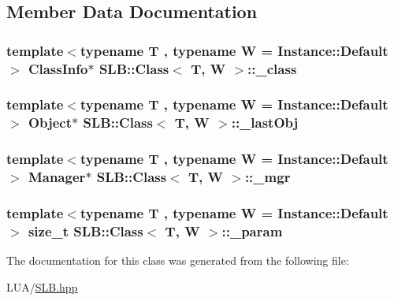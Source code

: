 \subsection{Member Data Documentation}
\subsubsection[{\texorpdfstring{\+\_\+class}{_class}}]{\setlength{\rightskip}{0pt plus 5cm}template$<$typename T , typename W  = Instance\+::\+Default$>$ {\bf Class\+Info}$\ast$ {\bf S\+L\+B\+::\+Class}$<$ T, W $>$\+::\+\_\+class\hspace{0.3cm}{\ttfamily [protected]}}\hypertarget{classSLB_1_1Class_a5ae85558a02bdbc796fc8ebf7a9cca2b}{}\label{classSLB_1_1Class_a5ae85558a02bdbc796fc8ebf7a9cca2b}
\subsubsection[{\texorpdfstring{\+\_\+last\+Obj}{_lastObj}}]{\setlength{\rightskip}{0pt plus 5cm}template$<$typename T , typename W  = Instance\+::\+Default$>$ {\bf Object}$\ast$ {\bf S\+L\+B\+::\+Class}$<$ T, W $>$\+::\+\_\+last\+Obj\hspace{0.3cm}{\ttfamily [protected]}}\hypertarget{classSLB_1_1Class_adbba74b40f432641cffacd452b1b13de}{}\label{classSLB_1_1Class_adbba74b40f432641cffacd452b1b13de}
\subsubsection[{\texorpdfstring{\+\_\+mgr}{_mgr}}]{\setlength{\rightskip}{0pt plus 5cm}template$<$typename T , typename W  = Instance\+::\+Default$>$ {\bf Manager}$\ast$ {\bf S\+L\+B\+::\+Class}$<$ T, W $>$\+::\+\_\+mgr\hspace{0.3cm}{\ttfamily [protected]}}\hypertarget{classSLB_1_1Class_a96cb9cefa58fc5b76221d227b74151e2}{}\label{classSLB_1_1Class_a96cb9cefa58fc5b76221d227b74151e2}
\subsubsection[{\texorpdfstring{\+\_\+param}{_param}}]{\setlength{\rightskip}{0pt plus 5cm}template$<$typename T , typename W  = Instance\+::\+Default$>$ size\+\_\+t {\bf S\+L\+B\+::\+Class}$<$ T, W $>$\+::\+\_\+param\hspace{0.3cm}{\ttfamily [protected]}}\hypertarget{classSLB_1_1Class_a4c8587ec0639601fd49f15d65eba2a63}{}\label{classSLB_1_1Class_a4c8587ec0639601fd49f15d65eba2a63}


The documentation for this class was generated from the following file\+:\begin{DoxyCompactItemize}
\item 
L\+U\+A/\hyperlink{SLB_8hpp}{S\+L\+B.\+hpp}\end{DoxyCompactItemize}

